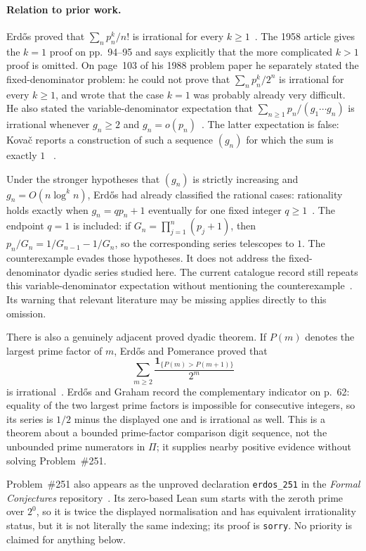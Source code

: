 \documentclass[11pt]{article}
\begin{document}
\paragraph{Relation to prior work.}
Erd\H{o}s proved that $\sum_n p_n^{k}/n!$ is irrational for every
$k\ge1$~\cite[p.~93]{erdos1958}.  The 1958 article gives the $k=1$ proof on
pp.~94--95 and says explicitly that the more complicated $k>1$ proof is
omitted.  On page~103 of his 1988 problem paper he separately
stated the fixed-denominator problem: he could not prove that
$\sum_n p_n^{k}/2^{n}$ is irrational for every $k\ge1$, and wrote that
the case $k=1$ was probably already very difficult.  He also stated the
variable-denominator expectation that
$\sum_{n\ge1}p_n/(g_1\cdots g_n)$ is irrational whenever $g_n\ge2$ and
$g_n=o(p_n)$~\cite[p.~103]{erdos1988}.  The latter expectation is false:
Kova\v{c} reports a construction of such a sequence $(g_n)$ for which the sum
is exactly $1$
~\cite[Theorem~1 and proof, pp.~1--2]{kovac2026}.

Under the stronger
hypotheses that $(g_n)$ is strictly increasing and
$g_n=O(n\log^k n)$, Erd\H{o}s had already classified the rational cases:
rationality holds exactly when $g_n=q p_n+1$ eventually for one fixed integer
$q\ge1$~\cite[pp.~96--99]{erdos1958}.  The endpoint $q=1$ is included: if
$G_n=\prod_{j=1}^{n}(p_j+1)$, then
$p_n/G_n=1/G_{n-1}-1/G_n$, so the corresponding series telescopes to $1$.
The counterexample evades those
hypotheses.  It
does not address the fixed-denominator dyadic series studied here.  The
current catalogue record still repeats this variable-denominator expectation
without mentioning the counterexample~\cite{erdosproblems}.  Its warning that
relevant literature may be missing applies directly to this omission.

There is also a genuinely adjacent proved dyadic theorem.  If $P(m)$ denotes
the largest prime factor of $m$, Erd\H{o}s and Pomerance proved that
\[
 \sum_{m\ge2}\frac{\mathbf 1_{\{P(m)>P(m+1)\}}}{2^m}
\]
is irrational~\cite[\S7, p.~320]{erdospomerance1978}.  Erd\H{o}s and Graham
record the complementary indicator on p.~62: equality of the two largest
prime factors is impossible for consecutive integers, so its series is
$1/2$ minus the displayed one and is irrational as well.  This is a theorem
about a bounded prime-factor comparison digit sequence, not the unbounded
prime numerators in $\Pi$; it supplies nearby positive evidence without
solving Problem~\#251.

Problem~\#251 also appears as the unproved declaration
\texttt{erdos\_251} in the \emph{Formal Conjectures}
repository~\cite{formalconjectures251}.  Its zero-based Lean sum starts with
the zeroth prime over $2^0$, so it is twice the displayed normalisation and
has equivalent irrationality status, but it is not literally the same
indexing; its proof is \texttt{sorry}.  No priority is claimed for anything
below.
\end{document}
